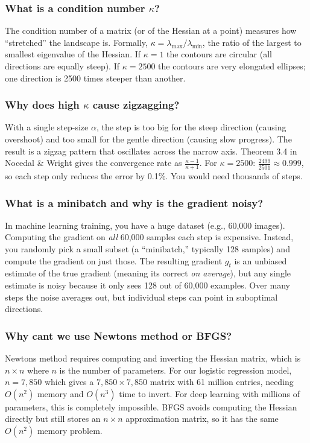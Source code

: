 \documentclass[11pt, letterpaper]{article}
\begin{document}
\begin{deepdive}
\subsubsection{What is a condition number $\kappa$?}
The condition number of a matrix (or of the Hessian at a point) measures how ``stretched'' the landscape is. Formally, $\kappa = \lambda_{\max} / \lambda_{\min}$, the ratio of the largest to smallest eigenvalue of the Hessian. If $\kappa = 1$ the contours are circular (all directions are equally steep). If $\kappa = 2500$ the contours are very elongated ellipses; one direction is 2500 times steeper than another.

\subsubsection{Why does high $\kappa$ cause zigzagging?}
With a single step-size $\alpha$, the step is too big for the steep direction (causing overshoot) and too small for the gentle direction (causing slow progress). The result is a zigzag pattern that oscillates across the narrow axis. Theorem 3.4 in Nocedal \& Wright gives the convergence rate as $\frac{\kappa - 1}{\kappa + 1}$. For $\kappa = 2500$: $\frac{2499}{2501} \approx 0.999$, so each step only reduces the error by 0.1\%. You would need thousands of steps.

\subsubsection{What is a minibatch and why is the gradient noisy?}
In machine learning training, you have a huge dataset (e.g., 60,000 images). Computing the gradient on \textit{all} 60,000 samples each step is expensive. Instead, you randomly pick a small subset (a ``minibatch,'' typically 128 samples) and compute the gradient on just those. The resulting gradient $g_t$ is an unbiased estimate of the true gradient (meaning its correct \textit{on average}), but any single estimate is noisy because it only sees 128 out of 60,000 examples. Over many steps the noise averages out, but individual steps can point in suboptimal directions.

\subsubsection{Why cant we use Newtons method or BFGS?}
Newtons method requires computing and inverting the Hessian matrix, which is $n \times n$ where $n$ is the number of parameters. For our logistic regression model, $n = 7{,}850$ which gives a $7{,}850 \times 7{,}850$ matrix with 61 million entries, needing $O(n^2)$ memory and $O(n^3)$ time to invert. For deep learning with millions of parameters, this is completely impossible. BFGS avoids computing the Hessian directly but still stores an $n \times n$ approximation matrix, so it has the same $O(n^2)$ memory problem.


\end{deepdive}
\end{document}
